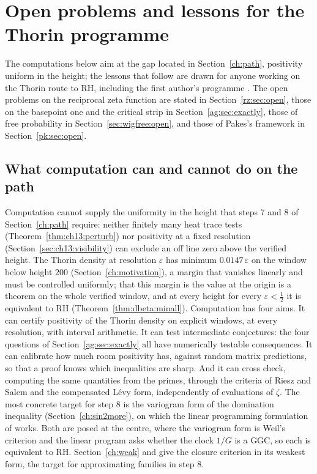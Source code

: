 \section{Open problems and lessons for the Thorin programme}\label{ch:open}

The computations below aim at the gap located in Section~\ref{ch:path}, positivity uniform in the height; the lessons that follow are drawn for anyone working on the Thorin route to RH, including the first author's programme \cite{P26}. The open problems on the reciprocal zeta function are stated in Section~\ref{rz:sec:open}, those on the basepoint one and the critical strip in Section~\ref{ag:sec:exactly}, those of free probability in Section~\ref{sec:wigfree:open}, and those of Pakes's framework in Section~\ref{pk:sec:open}.

\subsection{What computation can and cannot do on the path}\label{sec:open}\label{st:sec:role}\label{sec:ch25:contrib}

Computation cannot supply the uniformity in the height that steps 7 and 8 of Section~\ref{ch:path} require: neither finitely many heat trace tests (Theorem~\ref{thm:ch13:perturb}) nor positivity at a fixed resolution (Section~\ref{sec:ch13:visibility}) can exclude an off line zero above the verified height. The Thorin density at resolution $\varepsilon$ has minimum $0.0147\,\varepsilon$ on the window below height $200$ (Section~\ref{ch:motivation}), a margin that vanishes linearly and must be controlled uniformly; that this margin is the value at the origin is a theorem on the whole verified window, and at every height for every $\varepsilon<\frac12$ it is equivalent to RH (Theorem~\ref{thm:dbeta:minall}). Computation has four aims. It can certify positivity of the Thorin density on explicit windows, at every resolution, with interval arithmetic. It can test intermediate conjectures: the four questions of Section~\ref{ag:sec:exactly} all have numerically testable consequences. It can calibrate how much room positivity has, against random matrix predictions, so that a proof knows which inequalities are sharp. And it can cross check, computing the same quantities from the primes, through the criteria of Riesz and Salem and the compensated L\'evy form, independently of evaluations of $\zeta$. The most concrete target for step 8 is the variogram form of the domination inequality (Section~\ref{ch:sin2more}), on which the linear programming formulation of \cite[Sections 18.2.8 and 18.2.9]{P26} works. Both are posed at the centre, where the variogram form is Weil's criterion and the linear program asks whether the clock $1/G$ is a GGC, so each is equivalent to RH. Section~\ref{ch:weak} and \cite[Section 18.2.3]{P26} give the closure criterion in its weakest form, the target for approximating families in step 8.

